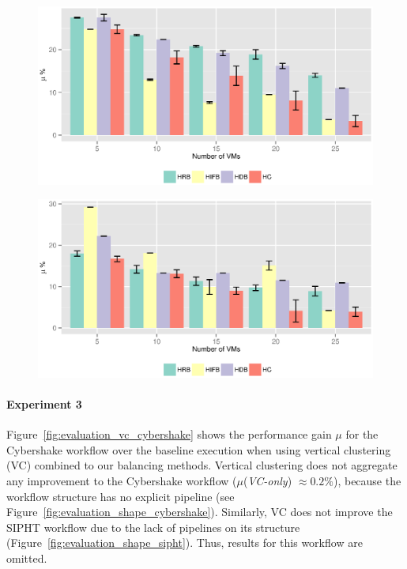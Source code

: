 \begin{figure}[!htb]
	\centering
	\includegraphics[width=1.0\linewidth]{figures/balance/figure22.eps}
	\label{fig:evaluation_resource_1}
\end{figure}

\begin{figure}[!htb]
	\centering
	\includegraphics[width=1.0\linewidth]{figures/balance/figure23.eps}
	\label{fig:evaluation_resource_2}
\end{figure}


\paragraph{\textbf{Experiment 3}}
Figure~\ref{fig:evaluation_vc_cybershake} shows the performance gain $\mu$ for the Cybershake workflow over the baseline execution when using vertical clustering (VC) combined to our balancing methods. Vertical clustering does not aggregate any improvement to the Cybershake workflow ($\mu$(\emph{VC-only}) $\approx 0.2\%$), because the workflow structure has no explicit pipeline (see Figure~\ref{fig:evaluation_shape_cybershake}). Similarly, VC does not improve the SIPHT workflow due to the lack of pipelines on its structure (Figure~\ref{fig:evaluation_shape_sipht}). Thus, results for this workflow are omitted.

